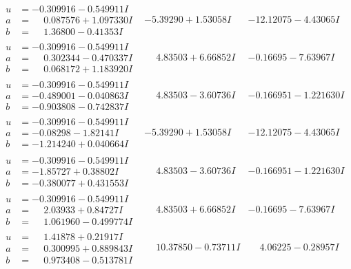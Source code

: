 \documentclass[1p]{elsarticle_modified}
\theoremstyle{definition}
\begin{document}
$$\begin{array}{c|c|c}
\begin{aligned}
u &= -0.309916 - 0.549911 I \\
a &= \phantom{-}0.087576 + 1.097330 I \\
b &= \phantom{-}1.36800 - 0.41353 I\end{aligned}
 & -5.39290 + 1.53058 I & -12.12075 - 4.43065 I \\ \hline\begin{aligned}
u &= -0.309916 - 0.549911 I \\
a &= \phantom{-}0.302344 - 0.470337 I \\
b &= \phantom{-}0.068172 + 1.183920 I\end{aligned}
 & \phantom{-}4.83503 + 6.66852 I & -0.16695 - 7.63967 I \\ \hline\begin{aligned}
u &= -0.309916 - 0.549911 I \\
a &= -0.489001 - 0.040863 I \\
b &= -0.903808 - 0.742837 I\end{aligned}
 & \phantom{-}4.83503 - 3.60736 I & -0.166951 - 1.221630 I \\ \hline\begin{aligned}
u &= -0.309916 - 0.549911 I \\
a &= -0.08298 - 1.82141 I \\
b &= -1.214240 + 0.040664 I\end{aligned}
 & -5.39290 + 1.53058 I & -12.12075 - 4.43065 I \\ \hline\begin{aligned}
u &= -0.309916 - 0.549911 I \\
a &= -1.85727 + 0.38802 I \\
b &= -0.380077 + 0.431553 I\end{aligned}
 & \phantom{-}4.83503 - 3.60736 I & -0.166951 - 1.221630 I \\ \hline\begin{aligned}
u &= -0.309916 - 0.549911 I \\
a &= \phantom{-}2.03933 + 0.84727 I \\
b &= \phantom{-}1.061960 - 0.499774 I\end{aligned}
 & \phantom{-}4.83503 + 6.66852 I & -0.16695 - 7.63967 I \\ \hline\begin{aligned}
u &= \phantom{-}1.41878 + 0.21917 I \\
a &= \phantom{-}0.300995 + 0.889843 I \\
b &= \phantom{-}0.973408 - 0.513781 I\end{aligned}
 & \phantom{-}10.37850 - 0.73711 I & \phantom{-}4.06225 - 0.28957 I \\ \hline\begin{aligned}

\end{aligned}
\end{array}$$
\end{document}

